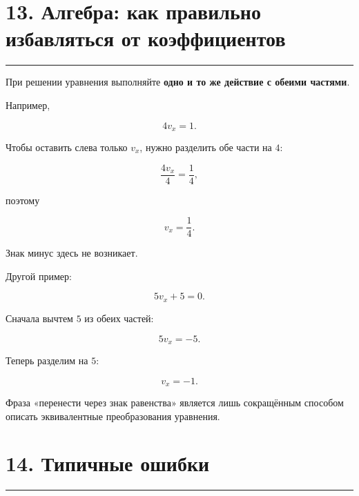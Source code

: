 \documentclass[a4paper,12pt]{article}
\newcommand{\sectionline}{%
  \par\noindent\color{accent}\rule{\linewidth}{0.5pt}\color{textgray}\par
}
\newcommand{\important}[1]{\textbf{\color{darkaccent}#1}}
\begin{document}

\section{\color{darkaccent}13. Алгебра: как правильно избавляться от коэффициентов}
\sectionline

При решении уравнения выполняйте \important{одно и то же действие с обеими частями}.

Например,

\[
4v_x=1.
\]

Чтобы оставить слева только \(v_x\), нужно разделить обе части на \(4\):

\[
\frac{4v_x}{4}=\frac14,
\]

поэтому

\[
\boxed{v_x=\frac14}.
\]

Знак минус здесь не возникает.

Другой пример:

\[
5v_x+5=0.
\]

Сначала вычтем \(5\) из обеих частей:

\[
5v_x=-5.
\]

Теперь разделим на \(5\):

\[
\boxed{v_x=-1}.
\]

Фраза «перенести через знак равенства» является лишь сокращённым способом
описать эквивалентные преобразования уравнения.


\section{\color{darkaccent}14. Типичные ошибки}
\sectionline
\end{document}
